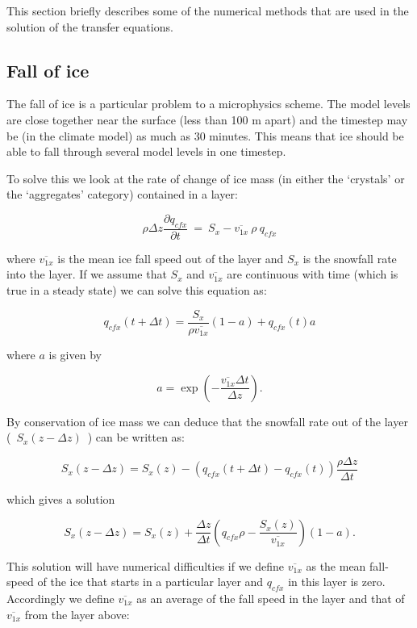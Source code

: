 \documentclass{UMDP_article}
\def\bq{\begin{equation}}
\def\eq{\end{equation}}
\begin{document}
This section briefly describes some of the numerical methods that are used in
the solution of the transfer equations.

\subsection{Fall of ice}

The fall of ice is a particular problem to a microphysics scheme. The model
levels are close together near the surface (less than 100 m apart) and the
timestep may be (in the climate model) as much as 30 minutes. This means that
ice should be able to fall through several model levels in one timestep.

To solve this we look at the rate of change of ice mass (in either the `crystals'
or the `aggregates' category) contained in a layer:

\bq
\rho \Delta z \frac{\partial q_{cfx}}{\partial t} ~=~ S_x - 
\overline{v_{1x}} ~\rho~ q_{cfx}
\eq

where $\overline{v_{1x}}$ is the mean ice fall speed out of the layer and $S_x$
is the snowfall rate into the layer. If we assume that $S_x$ and  
$\overline{v_{1x}}$
are continuous with time (which is true in a steady state) we can solve this
equation as:

\bq
q_{cfx}(t+\Delta t) = \frac{S_x}{\rho \overline{v_{1x}}} (1 - a) + q_{cfx}(t) a
\eq

where $a$ is given by

\bq
a = \exp \left( - \frac{\overline{v_{1x}} \Delta t}{\Delta z} \right) .
\eq

By conservation of ice mass we can deduce that the snowfall rate out of the
layer \\
(~$S_x(z-\Delta z)$~) can be written as:

\bq
S_x(z-\Delta z) = S_x(z) - \left( q_{cfx}(t+\Delta t) - q_{cfx}(t) \right) 
\frac{ \rho \Delta z}{\Delta t}
\eq

which gives a solution

\bq 
S_x(z-\Delta z) = S_x(z) + \frac{\Delta z}{\Delta t} \left( q_{cfx} \rho
- \frac{S_x(z)}{\overline{v_{1x}}} \right) \left( 1 - a \right) .
\eq

This solution will have numerical difficulties if we define $\overline{v_{1x}}$ 
as the mean fall-speed of the ice that starts in a particular layer and $q_{cfx}$ 
in this layer is zero. Accordingly we define $\overline{v_{1x}}$ as an average 
of the fall speed in the layer and that of $\overline{v_{1x}}$ from the layer 
above:
\end{document}
